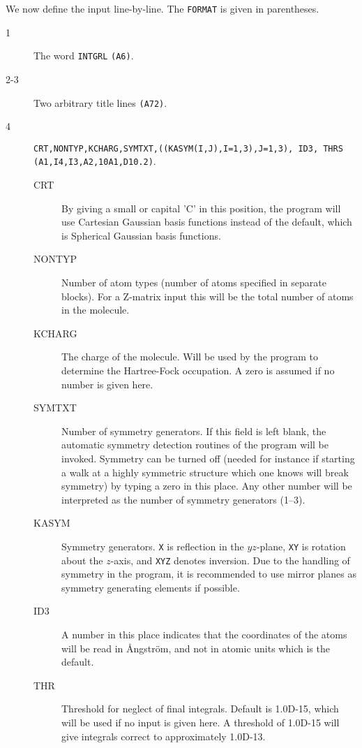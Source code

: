 We now define the input line-by-line.  The {\tt FORMAT} is given
in parentheses.
\begin{description}
\item[1] The word \verb|INTGRL| {\tt (A6)}.
\item[2-3] Two arbitrary title lines {\tt (A72)}.
\item[4] \verb|CRT,NONTYP,KCHARG,SYMTXT,((KASYM(I,J),I=1,3),J=1,3), ID3, THRS|
{\tt (A1,I4,I3,A2,10A1,D10.2)}.
\begin{description}
\item[CRT] By giving a small or capital 'C' in this
position, the program will use Cartesian Gaussian basis
functions instead of
the default, which is Spherical Gaussian basis
functions.
\item[NONTYP] Number of atom types (number of atoms specified
in separate blocks). For a Z-matrix input this will be the total
number of atoms in the molecule.
\item[KCHARG] The charge of the molecule. Will be used  by
the program to determine the Hartree-Fock occupation. A zero is
assumed if no number is given here.
\item[SYMTXT] Number of symmetry generators. If this field is
left blank, the automatic symmetry detection
routines of the program will be
invoked. Symmetry can be turned off (needed for instance if starting a
walk at a highly symmetric structure which one knows will break
symmetry) by typing a zero in this place. Any other number will be
interpreted as the number of symmetry generators (1--3).
\item[KASYM] Symmetry generators.  {\tt X}
is reflection
in the \mbox{$yz$-plane}, {\tt XY} is rotation about
the \mbox{$z$-axis},
and {\tt XYZ} denotes inversion. Due to the handling
of symmetry in
the program, it is recommended to use mirror planes as symmetry
generating elements if possible.

\item[ID3] A number in this place indicates that the
coordinates of the atoms will be read in \AA ngstr\"{o}m, and not in
atomic units which is the default.
\item[THR] Threshold for neglect of final integrals. Default
is 1.0D-15, which will be used if no input is given here. A threshold
of 1.0D-15 will give integrals correct to approximately 1.0D-13.
\end{description}
\end{description}

